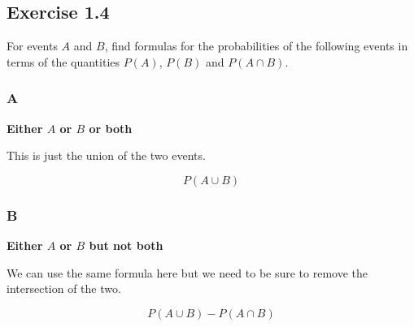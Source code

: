 \subsection*{Exercise 1.4}

For events $A$ and $B$, find formulas for the probabilities of the following events in terms of the quantities $P(A)$, $P(B)$ and $P(A \cap B)$.

\subsubsection*{A}

\textbf{Either $A$ or $B$ or both}

This is just the union of the two events.

\[P(A \cup B)\]

\subsubsection*{B}

\textbf{Either $A$ or $B$ but not both}

We can use the same formula here but we need to be sure to remove the intersection of the two.

\[P(A \cup B) - P(A \cap B)\]
